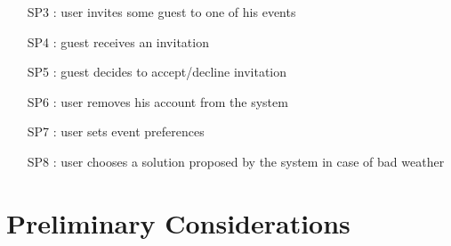 \documentclass[12pt]{book}
\begin{document}
\begin{itemize}
\begin{enumerate}
			\item [SP3] : user invites some guest to one of his events\\
			\item [SP4] : guest receives an invitation\\
			\item [SP5] : guest decides to accept/decline invitation\\
			\item [SP6] : user removes his account from the system\\
			\item [SP7] : user sets event preferences \\
			\item [SP8] : user chooses a solution proposed by the system in case of bad weather\\
		\end{enumerate}
\end{itemize}

\section{Preliminary Considerations}
\end{document}

